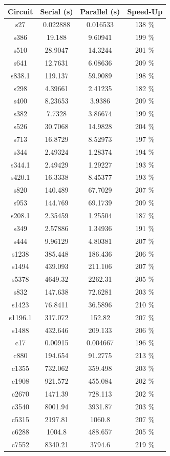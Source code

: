 \documentclass[a4paper,12pt]{article}
\begin{document}
\begin{center}
\begin{tabular}{||c c c c||}
\hline
Circuit & Serial (s) & Parallel (s) & Speed-Up \\ [0.5ex] 
\hline\hline
s27 & 0.022888 & 0.016533 & 138 \% \\ 
\hline
s386 & 19.188 & 9.60941 & 199 \% \\ 
\hline
s510 & 28.9047 & 14.3244 & 201 \% \\ 
\hline
s641 & 12.7631 & 6.08636 & 209 \% \\ 
\hline
s838.1 & 119.137 & 59.9089 & 198 \% \\ 
\hline
s298 & 4.39661 & 2.41235 & 182 \% \\ 
\hline
s400 & 8.23653 & 3.9386 & 209 \% \\ 
\hline
s382 & 7.7328 & 3.86674 & 199 \% \\ 
\hline
s526 & 30.7068 & 14.9828 & 204 \% \\ 
\hline
s713 & 16.8729 & 8.52973 & 197 \% \\ 
\hline
s344 & 2.49324 & 1.28374 & 194 \% \\ 
\hline
s344.1 & 2.49429 & 1.29227 & 193 \% \\ 
\hline
s420.1 & 16.3338 & 8.45377 & 193 \% \\ 
\hline
s820 & 140.489 & 67.7029 & 207 \% \\ 
\hline
s953 & 144.769 & 69.1739 & 209 \% \\ 
\hline
s208.1 & 2.35459 & 1.25504 & 187 \% \\ 
\hline
s349 & 2.57886 & 1.34936 & 191 \% \\ 
\hline
s444 & 9.96129 & 4.80381 & 207 \% \\ 
\hline
s1238 & 385.448 & 186.436 & 206 \% \\ 
\hline
s1494 & 439.093 & 211.106 & 207 \% \\ 
\hline
s5378 & 4649.32 & 2262.31 & 205 \% \\ 
\hline
s832 & 147.638 & 72.6281 & 203 \% \\ 
\hline
s1423 & 76.8411 & 36.5896 & 210 \% \\ 
\hline
s1196.1 & 317.072 & 152.82 & 207 \% \\ 
\hline
s1488 & 432.646 & 209.133 & 206 \% \\ 
\hline
c17 & 0.00915 & 0.004667 & 196 \% \\ 
\hline
c880 & 194.654 & 91.2775 & 213 \% \\ 
\hline
c1355 & 732.062 & 359.498 & 203 \% \\ 
\hline
c1908 & 921.572 & 455.084 & 202 \% \\ 
\hline
c2670 & 1471.39 & 728.113 & 202 \% \\ 
\hline
c3540 & 8001.94 & 3931.87 & 203 \% \\ 
\hline
c5315 & 2197.81 & 1060.8 & 207 \% \\ 
\hline
c6288 & 1004.8 & 488.657 & 205 \% \\ 
\hline
c7552 & 8340.21 & 3794.6 & 219 \% \\ 
\hline\hline


\end{tabular}
\end{center}
\end{document}
